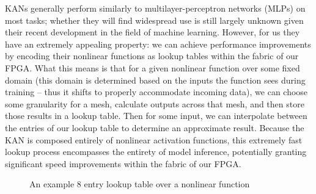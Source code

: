 \documentclass[psamsfonts]{amsart}
\theoremstyle{definition}
\theoremstyle{remark}
\numberwithin{equation}{section}
\begin{document}
KANs generally perform similarly to multilayer-perceptron networks (MLPs) on most tasks; whether they will find widespread use is still largely unknown given their recent development in the field of machine learning. However, for us they have an extremely appealing property: we can achieve performance improvements by encoding their nonlinear functions as lookup tables within the fabric of our FPGA. What this means is that for a given nonlinear function over some fixed domain (this domain is determined based on the inputs the function sees during training -- thus it shifts to properly accommodate incoming data), we can choose some granularity for a mesh, calculate outputs across that mesh, and then store those results in a lookup table. Then for some input, we can interpolate between the entries of our lookup table to determine an approximate result. Because the KAN is composed entirely of nonlinear activation functions, this extremely fast lookup process encompasses the entirety of model inference, potentially granting significant speed improvements within the fabric of our FPGA.

\begin{figure}[H]
  \caption{An example 8 entry lookup table over a nonlinear function}
  \label{fig:lkup-diagram}
\end{figure}
\end{document}
